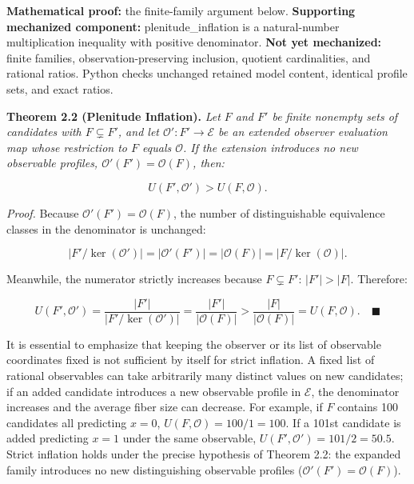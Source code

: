 \documentclass[
  10pt,
]{article}
\begin{document}
\textbf{Mathematical proof:} the finite-family argument below. \textbf{Supporting mechanized component:} plenitude\_inflation is a natural-number multiplication inequality with positive denominator. \textbf{Not yet mechanized:} finite families, observation-preserving inclusion, quotient cardinalities, and rational ratios. Python checks unchanged retained model content, identical profile sets, and exact ratios.

\textbf{Theorem 2.2 (Plenitude Inflation).} \emph{Let \hypertarget{math-E0005-0044}{}{\(F\)} and \hypertarget{math-E0041-0045}{}{\(F'\)} be finite nonempty sets of candidates with \hypertarget{math-E0042-0046}{}{\(F \subsetneq F'\)}, and let \hypertarget{math-E0043-0047}{}{\(\mathcal{O}': F' \to \mathcal{E}\)} be an extended observer evaluation map whose restriction to \hypertarget{math-E0005-0048}{}{\(F\)} equals \hypertarget{math-E0014-0049}{}{\(\mathcal{O}\)}. If the extension introduces no new observable profiles, \hypertarget{math-E0003-0050}{}{\(\mathcal{O}'(F') = \mathcal{O}(F)\)}, then:}

\hypertarget{math-E0044-0051}{}{\[U(F', \mathcal{O}') > U(F, \mathcal{O}).\]}

\emph{Proof.} Because \hypertarget{math-E0003-0052}{}{\(\mathcal{O}'(F') = \mathcal{O}(F)\)}, the number of distinguishable equivalence classes in the denominator is unchanged:

\hypertarget{math-E0045-0053}{}{\[|F' / \ker(\mathcal{O}')| = |\mathcal{O}'(F')| = |\mathcal{O}(F)| = |F / \ker(\mathcal{O})|.\]}

Meanwhile, the numerator strictly increases because \hypertarget{math-E0042-0054}{}{\(F \subsetneq F'\)}: \hypertarget{math-E0046-0055}{}{\(|F'| > |F|\)}. Therefore:

\hypertarget{math-E0047-0056}{}{\[U(F', \mathcal{O}') = \frac{|F'|}{|F' / \ker(\mathcal{O}')|} = \frac{|F'|}{|\mathcal{O}(F)|} > \frac{|F|}{|\mathcal{O}(F)|} = U(F, \mathcal{O}). \quad \blacksquare\]}

It is essential to emphasize that keeping the observer or its list of observable coordinates fixed is not sufficient by itself for strict inflation. A fixed list of rational observables can take arbitrarily many distinct values on new candidates; if an added candidate introduces a new observable profile in \hypertarget{math-E0016-0057}{}{\(\mathcal{E}\)}, the denominator increases and the average fiber size can decrease. For example, if \hypertarget{math-E0005-0058}{}{\(F\)} contains 100 candidates all predicting \hypertarget{math-E0048-0059}{}{\(x = 0\)}, \hypertarget{math-E0049-0060}{}{\(U(F, \mathcal{O}) = 100/1 = 100\)}. If a 101st candidate is added predicting \hypertarget{math-E0050-0061}{}{\(x = 1\)} under the same observable, \hypertarget{math-E0051-0062}{}{\(U(F', \mathcal{O}') = 101/2 = 50.5\)}. Strict inflation holds under the precise hypothesis of Theorem 2.2: the expanded family introduces no new distinguishing observable profiles (\hypertarget{math-E0003-0063}{}{\(\mathcal{O}'(F') = \mathcal{O}(F)\)}).
\end{document}
